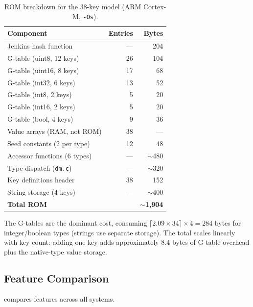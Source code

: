 \documentclass[10pt,twocolumn,letterpaper]{article}
\begin{document}
\begin{table}[t]
\centering
\footnotesize
\begin{tabular}{@{}lrr@{}}
\toprule
\textbf{Component} & \textbf{Entries} & \textbf{Bytes} \\
\midrule
Jenkins hash function & --- & 204 \\
G-table (uint8, 12 keys) & 26 & 104 \\
G-table (uint16, 8 keys) & 17 & 68 \\
G-table (int32, 6 keys) & 13 & 52 \\
G-table (int8, 2 keys) & 5 & 20 \\
G-table (int16, 2 keys) & 5 & 20 \\
G-table (bool, 4 keys) & 9 & 36 \\
Value arrays (RAM, not ROM) & 38 & --- \\
Seed constants (2 per type) & 12 & 48 \\
Accessor functions (6 types) & --- & $\sim$480 \\
Type dispatch (\texttt{dm.c}) & --- & $\sim$320 \\
Key definitions header & 38 & 152 \\
String storage (4 keys) & --- & $\sim$400 \\
\midrule
\textbf{Total ROM} & & $\sim$\textbf{1,904} \\
\bottomrule
\end{tabular}
\caption{ROM breakdown for the 38-key model (ARM Cortex-M, \texttt{-Os}).}
\label{tab:rom-breakdown}
\end{table}

The G-tables are the dominant cost, consuming $\lceil 2.09 \times 34
\rceil \times 4 = 284$ bytes for integer/boolean types (strings use
separate storage).  The total scales linearly with key count: adding
one key adds approximately 8.4 bytes of G-table overhead plus the
native-type value storage.

\subsection{Feature Comparison}

 compares features across all systems.
\end{document}
